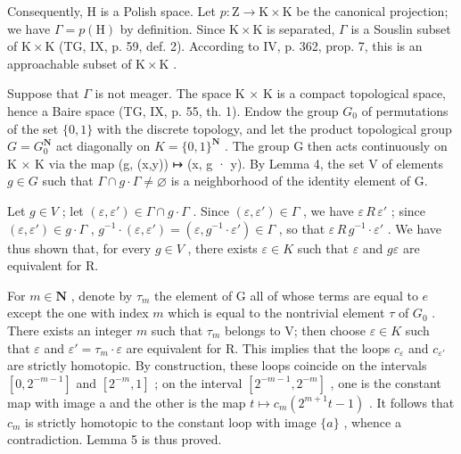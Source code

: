 Consequently, H is a Polish space. Let \(p \colon \mathrm{Z} \to \mathrm{K} \times \mathrm{K}\) be the canonical projection; we have \(\Gamma = p(\mathrm{H})\) by definition. Since \(\mathrm{K} \times \mathrm{K}\) is separated, \(\Gamma\) is a Souslin subset of \(\mathrm{K} \times \mathrm{K}\) (TG, IX, p. 59, def. 2). According to IV, p. 362, prop. 7, this is an approachable subset of \(\mathrm{K} \times \mathrm{K}\) .

Suppose that \(\Gamma\) is not meager. The space K × K is a compact topological space, hence a Baire space (TG, IX, p. 55, th. 1). Endow the group \(G_{0}\) of permutations of the set \(\{0,1\}\) with the discrete topology, and let the product topological group \(G = G_{0}^{\mathbf{N}}\) act diagonally on \(K = \{0,1\}^{\mathbf{N}}\) . The group G then acts continuously on K × K via the map (g, (x,y)) ↦ (x, g · y). By Lemma 4, the set V of elements \(g \in G\) such that \(\Gamma \cap g \cdot \Gamma \neq \varnothing\) is a neighborhood of the identity element of G.

Let \(g \in V\) ; let \((\varepsilon, \varepsilon') \in \Gamma \cap g \cdot \Gamma\) . Since \((\varepsilon, \varepsilon') \in \Gamma\) , we have \(\varepsilon\,R\,\varepsilon'\) ; since \((\varepsilon, \varepsilon') \in g \cdot \Gamma\) , \(g^{-1} \cdot (\varepsilon, \varepsilon') = (\varepsilon, g^{-1}\cdot\varepsilon') \in \Gamma\) , so that \(\varepsilon\,R\,g^{-1}\cdot\varepsilon'\) . We have thus shown that, for every \(g \in V\) , there exists \(\varepsilon \in K\) such that \(\varepsilon\) and \(g\varepsilon\) are equivalent for R.

For \(m \in \mathbf{N}\) , denote by \(\tau_m\) the element of G all of whose terms are equal to \(e\) except the one with index \(m\) which is equal to the nontrivial element \(\tau\) of \(G_0\) . There exists an integer \(m\) such that \(\tau_m\) belongs to V; then choose \(\varepsilon \in K\) such that \(\varepsilon\) and \(\varepsilon' = \tau_m \cdot \varepsilon\) are equivalent for R. This implies that the loops \(c_{\varepsilon}\) and \(c_{\varepsilon'}\) are strictly homotopic. By construction, these loops coincide on the intervals \([0, 2^{-m-1}]\) and \([2^{-m}, 1]\) ; on the interval \([2^{-m-1}, 2^{-m}]\) , one is the constant map with image a and the other is the map \(t \mapsto c_{m}(2^{m+1}t - 1)\) . It follows that \(c_{m}\) is strictly homotopic to the constant loop with image \(\{a\}\) , whence a contradiction. Lemma 5 is thus proved.

